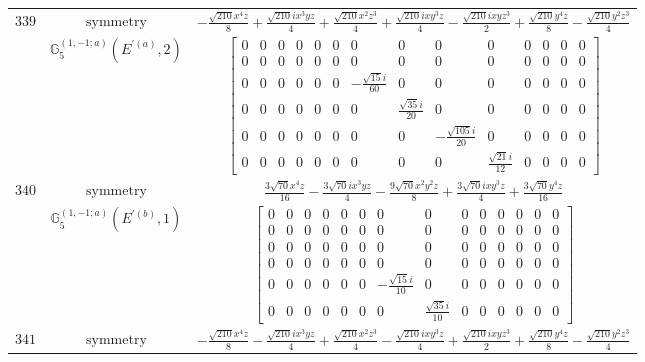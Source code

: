 \documentclass[fleqn,8pt,landscape]{jsarticle}
\begin{document}
\begin{longtable}{ccc}
$ 339 $ & $ \text{symmetry} $ & $ - \frac{\sqrt{210} x^{4} z}{8} + \frac{\sqrt{210} i x^{3} y z}{4} + \frac{\sqrt{210} x^{2} z^{3}}{4} + \frac{\sqrt{210} i x y^{3} z}{4} - \frac{\sqrt{210} i x y z^{3}}{2} + \frac{\sqrt{210} y^{4} z}{8} - \frac{\sqrt{210} y^{2} z^{3}}{4} $ \\
$  $ & $ \mathbb{G}_{5}^{(1,-1;a)}(E^{\prime(a)},2) $ & $ \begin{bmatrix} 0 & 0 & 0 & 0 & 0 & 0 & 0 & 0 & 0 & 0 & 0 & 0 & 0 & 0 \\ 0 & 0 & 0 & 0 & 0 & 0 & 0 & 0 & 0 & 0 & 0 & 0 & 0 & 0 \\ 0 & 0 & 0 & 0 & 0 & 0 & - \frac{\sqrt{15} i}{60} & 0 & 0 & 0 & 0 & 0 & 0 & 0 \\ 0 & 0 & 0 & 0 & 0 & 0 & 0 & \frac{\sqrt{35} i}{20} & 0 & 0 & 0 & 0 & 0 & 0 \\ 0 & 0 & 0 & 0 & 0 & 0 & 0 & 0 & - \frac{\sqrt{105} i}{20} & 0 & 0 & 0 & 0 & 0 \\ 0 & 0 & 0 & 0 & 0 & 0 & 0 & 0 & 0 & \frac{\sqrt{21} i}{12} & 0 & 0 & 0 & 0 \end{bmatrix} $ \\ \hline
$ 340 $ & $ \text{symmetry} $ & $ \frac{3 \sqrt{70} x^{4} z}{16} - \frac{3 \sqrt{70} i x^{3} y z}{4} - \frac{9 \sqrt{70} x^{2} y^{2} z}{8} + \frac{3 \sqrt{70} i x y^{3} z}{4} + \frac{3 \sqrt{70} y^{4} z}{16} $ \\
$  $ & $ \mathbb{G}_{5}^{(1,-1;a)}(E^{\prime(b)},1) $ & $ \begin{bmatrix} 0 & 0 & 0 & 0 & 0 & 0 & 0 & 0 & 0 & 0 & 0 & 0 & 0 & 0 \\ 0 & 0 & 0 & 0 & 0 & 0 & 0 & 0 & 0 & 0 & 0 & 0 & 0 & 0 \\ 0 & 0 & 0 & 0 & 0 & 0 & 0 & 0 & 0 & 0 & 0 & 0 & 0 & 0 \\ 0 & 0 & 0 & 0 & 0 & 0 & 0 & 0 & 0 & 0 & 0 & 0 & 0 & 0 \\ 0 & 0 & 0 & 0 & 0 & 0 & - \frac{\sqrt{15} i}{10} & 0 & 0 & 0 & 0 & 0 & 0 & 0 \\ 0 & 0 & 0 & 0 & 0 & 0 & 0 & \frac{\sqrt{35} i}{10} & 0 & 0 & 0 & 0 & 0 & 0 \end{bmatrix} $ \\ \hline
$ 341 $ & $ \text{symmetry} $ & $ - \frac{\sqrt{210} x^{4} z}{8} - \frac{\sqrt{210} i x^{3} y z}{4} + \frac{\sqrt{210} x^{2} z^{3}}{4} - \frac{\sqrt{210} i x y^{3} z}{4} + \frac{\sqrt{210} i x y z^{3}}{2} + \frac{\sqrt{210} y^{4} z}{8} - \frac{\sqrt{210} y^{2} z^{3}}{4} $ \\

\end{longtable}
\end{document}
